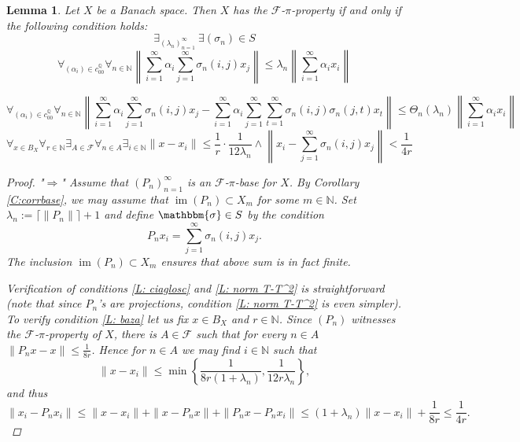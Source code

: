 \documentclass[12pt,fleqn]{amsart}
\newcommand{\IQ}{\mathbb{Q}}
\newcommand{\N}{\mathbb{N}}
\newcommand{\IN}{\mathbb{N}}
\newcommand{\FF}{\mathscr{F}}
\renewcommand{\leq}{\leqslant}
\newcommand{\ve}{\mathbbm}
\newtheorem{lemma}[theorem]{Lemma}
\theoremstyle{definition}
\theoremstyle{remark}
\begin{document}
\begin{lemma}\label{lem:main}
Let $X$ be a Banach space. Then $X$ has the $\FF$-$\pi$-property if and only if the following condition holds:
\begin{equation*}
\exists_{(\lambda_n)_{n=1}^\infty} \ \exists{(\sigma_{n})\in S} 
\end{equation*} 
\begin{equation}\label{L: ciaglosc}
\forall_{(\alpha_i)\in c_{00}^\IQ} \forall_{n\in \N} \left\| \sum_{i=1}^\infty \alpha_i \sum_{j=1}^\infty \sigma_{n}(i,j) x_j \right\| \leq \lambda_n \left\| \sum_{i=1}^\infty \alpha_i x_i \right\| 
\end{equation}

\begin{equation}\label{L: norm T-T^2}
\forall_{(\alpha_i)\in c_{00}^\IQ}\forall_{n\in\IN}\left\| \sum_{i=1}^\infty \alpha_i \sum_{j=1}^\infty \sigma_{n}(i,j) x_j - \sum_{i=1}^\infty \alpha_i\sum_{j=1}^\infty\sum_{t=1}^\infty  \sigma_{n}(i,j)\sigma_{n}(j,t) x_t \right\| \leq \Theta_n(\lambda_n) \left\|\sum_{i=1}^\infty \alpha_i x_i \right\| 
\end{equation}
\begin{equation}\label{L: baza}
    \forall_{x\in B_X} \forall_{r\in \IN} \exists_{A\in\FF} \forall_{n\in A}\exists_{i\in \IN} \| x-x_i\| \leq \frac1r\cdot\frac{1}{12\lambda_n} \wedge \left\|x_i - \sum_{j=1}^\infty \sigma_{n}(i,j) x_j\right\| < \frac{1}{4r} 
\end{equation}

\begin{proof}
"\(\Rightarrow\)" Assume that \((P_n)_{n=1}^\infty\) is an \(\mathcal{F}\)-\(\pi\)-base for \(X\). By Corollary \ref{C:corrbase}, we may assume that \(\operatorname{im}(P_n) \subset X_m\) for some \(m \in \mathbb{N}\). Set \(\lambda_n :=\big\lceil \|P_n\| \big\rceil + 1\) and define \(\ve{\sigma} \in S\) by the condition
\[
    P_nx_i = \sum_{j=1}^\infty \sigma_{n}(i,j) x_j.
\]
The inclusion \(\operatorname{im}(P_n) \subset X_m\) ensures that above sum is in fact finite. 

Verification of conditions \eqref{L: ciaglosc} and \ref{L: norm T-T^2} is straightforward (note that since $P_n$'s are projections, condition \ref{L: norm T-T^2} is even simpler). To verify condition \eqref{L: baza} let us fix $x\in B_X$ and $r\in \IN$. Since $(P_n)$ witnesses the $\FF$-$\pi$-property of $X$, there is $A\in \FF$ such that for every $n\in A$ $\|P_nx-x\|\leq \frac{1}{8r}$. Hence for $n \in A$ we may find $i\in \IN$ such that 
\[
    \|x-x_i\|\leq \min\left\{\frac{1}{8r(1+\lambda_n)},\frac{1}{12r\lambda_n}\right\},
\] and thus
\[
\|x_i-P_nx_i\|\leq \|x-x_i\|+\|x-P_nx\|+ \|P_nx-P_n x_i\| \leq (1+\lambda_n)\|x-x_i\|+ \frac{1}{8r} \leq \frac{1}{4r}.
\]


\end{proof}
\end{lemma}
\end{document}
